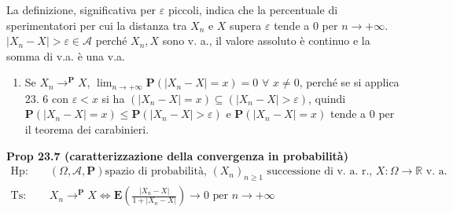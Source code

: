 \documentclass{article}
\begin{document}
La definizione, significativa per $\varepsilon $ piccoli, indica che la
percentuale di sperimentatori per cui la distanza tra $X_{n}$ e $X$ supera $%
\varepsilon $ tende a $0$ per $n\rightarrow +\infty $. $\left\vert
X_{n}-X\right\vert >\varepsilon \in \mathcal{A}$ perch\'{e} $X_{n},X$ sono
v. a., il valore assoluto \`{e} continuo e la somma di v.a. \`{e} una v.a.

\begin{enumerate}
\item Se $X_{n}\rightarrow ^{\mathbf{P}}X$, $\lim_{n\rightarrow +\infty }%
\mathbf{P}\left( \left\vert X_{n}-X\right\vert =x\right) =0$ $\forall $ $%
x\neq 0$, perch\'{e} se si applica 23. 6 con $\varepsilon <x$ si ha $\left(
\left\vert X_{n}-X\right\vert =x\right) \subseteq \left( \left\vert
X_{n}-X\right\vert >\varepsilon \right) $, quindi $\mathbf{P}\left(
\left\vert X_{n}-X\right\vert =x\right) \leq \mathbf{P}\left( \left\vert
X_{n}-X\right\vert >\varepsilon \right) $ e $\mathbf{P}\left( \left\vert
X_{n}-X\right\vert =x\right) $ tende a $0$ per il teorema dei carabinieri.
\end{enumerate}

\textbf{Prop 23.7 (caratterizzazione della convergenza in probabilit\`{a})}%
\begin{eqnarray*}
\text{Hp}\text{: } &&\left( \Omega ,\mathcal{A},\mathbf{P}\right) \text{
spazio di probabilit\`{a}, }\left( X_{n}\right) _{n\geq 1}\text{ successione
di v. a. r., }X:\Omega \rightarrow 
\mathbb{R}
\text{ v. a.} \\
\text{Ts}\text{: } &&X_{n}\rightarrow ^{\mathbf{P}}X\Longleftrightarrow 
\mathbf{E}\left( \frac{\left\vert X_{n}-X\right\vert }{1+\left\vert
X_{n}-X\right\vert }\right) \rightarrow 0\text{ per }n\rightarrow +\infty
\end{eqnarray*}
\end{document}
